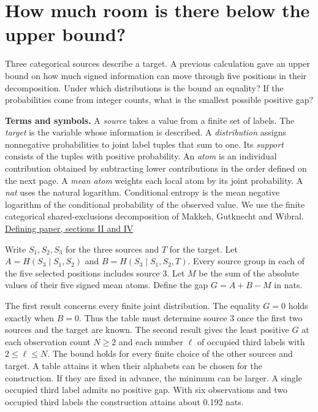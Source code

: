 \section{How much room is there below the upper bound?}\label{how-much-room-is-there-below-the-upper-bound}

Three categorical sources describe a target. A previous calculation gave an upper bound on how much signed information can move through five positions in their decomposition. Under which distributions is the bound an equality? If the probabilities come from integer counts, what is the smallest possible positive gap?

\textbf{Terms and symbols.} A \emph{source} takes a value from a finite set of labels. The \emph{target} is the variable whose information is described. A \emph{distribution} assigns nonnegative probabilities to joint label tuples that sum to one. Its \emph{support} consists of the tuples with positive probability. An \emph{atom} is an individual contribution obtained by subtracting lower contributions in the order defined on the next page. A \emph{mean atom} weights each local atom by its joint probability. A \emph{nat} uses the natural logarithm. Conditional entropy is the mean negative logarithm of the conditional probability of the observed value. We use the finite categorical shared-exclusions decomposition of Makkeh, Gutknecht and Wibral. \href{https://arxiv.org/abs/2002.03356v5}{Defining paper, sections II and IV}

Write \(S_1,S_2,S_3\) for the three sources and \(T\) for the target. Let \(A=H(S_3\mid S_1,S_2)\) and \(B=H(S_3\mid S_1,S_2,T)\). Every source group in each of the five selected positions includes source 3. Let \(M\) be the sum of the absolute values of their five signed mean atoms. Define the gap \(G=A+B-M\) in nats.

The first result concerns every finite joint distribution. The equality \(G=0\) holds exactly when \(B=0\). Thus the table must determine source 3 once the first two sources and the target are known. The second result gives the least positive \(G\) at each observation count \(N\geq2\) and each number \(\ell\) of occupied third labels with \(2\leq\ell\leq N\). The bound holds for every finite choice of the other sources and target. A table attains it when their alphabets can be chosen for the construction. If they are fixed in advance, the minimum can be larger. A single occupied third label admits no positive gap. With six observations and two occupied third labels the construction attains about 0.192 nats.

